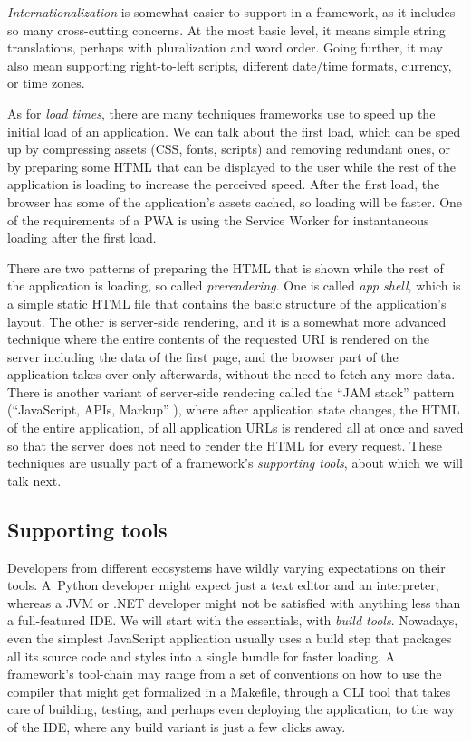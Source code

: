 \documentclass[english,zadani,odsaz]{fitthesis}
\begin{document}
\emph{Internationalization} is somewhat easier to support in a framework, as it
includes so many cross-cutting concerns. At the most basic level, it means
simple string translations, perhaps with pluralization and word order. Going
further, it may also mean supporting right-to-left scripts, different date/time
formats, currency, or time zones.

As for \emph{load times}, there are many techniques frameworks use to speed up the
initial load of an application. We can talk about the first load, which can be
sped up by compressing assets (CSS, fonts, scripts) and removing redundant ones,
or by preparing some HTML that can be displayed to the user while the rest of
the application is loading to increase the perceived speed. After the first
load, the browser has some of the application's assets cached, so loading will
be faster. One of the requirements of a PWA is using the Service Worker for
instantaneous loading after the first load.

There are two patterns of preparing the HTML that is shown while the rest of the
application is loading, so called \emph{prerendering}. One is called \emph{app shell}, which
is a simple static HTML file that contains the basic structure of the
application's layout. The other is server-side rendering, and it is a somewhat
more advanced technique where the entire contents of the requested URI is
rendered on the server including the data of the first page, and the browser
part of the application takes over only afterwards, without the need to fetch
any more data. There is another variant of server-side rendering called the ``JAM
stack'' pattern (``JavaScript, APIs, Markup'' \cite{jamstack}), where after
application state changes, the HTML of the entire application, of all
application URLs is rendered all at once and saved so that the server does not
need to render the HTML for every request. These techniques are usually part of
a framework's \emph{supporting tools}, about which we will talk next.

\subsection{Supporting tools}
\label{sec:orge77c1df}
Developers from different ecosystems have wildly varying expectations on their
tools. A~Python developer might expect just a text editor and an
interpreter, whereas a JVM or .NET developer might not be satisfied with
anything less than a full-featured IDE. We will start with the essentials, with
\emph{build tools}. Nowadays, even the simplest JavaScript application usually uses a
build step that packages all its source code and styles into a single bundle for
faster loading. A framework's tool-chain may range from a set of conventions on
how to use the compiler that might get formalized in a Makefile, through a CLI
tool that takes care of building, testing, and perhaps even deploying the
application, to the way of the IDE, where any build variant is just a few clicks
away.
\end{document}
